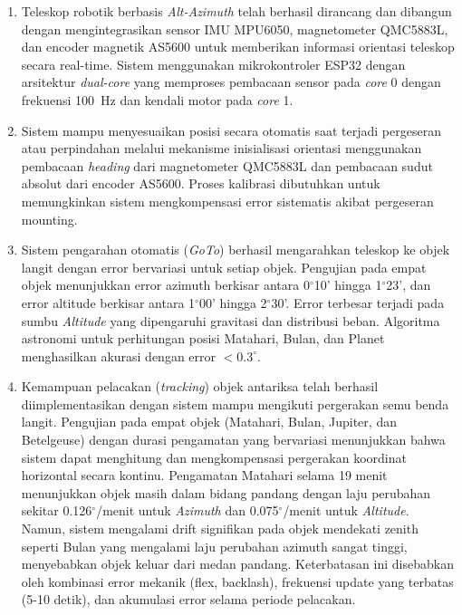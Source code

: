\begin{enumerate}
    \item Teleskop robotik berbasis \textit{Alt-Azimuth} telah berhasil dirancang dan dibangun dengan mengintegrasikan sensor IMU MPU6050, magnetometer QMC5883L, dan encoder magnetik AS5600 untuk memberikan informasi orientasi teleskop secara real-time. Sistem menggunakan mikrokontroler ESP32 dengan arsitektur \textit{dual-core} yang memproses pembacaan sensor pada \textit{core} 0 dengan frekuensi 100~Hz dan kendali motor pada \textit{core} 1.
    
    \item Sistem mampu menyesuaikan posisi secara otomatis saat terjadi pergeseran atau perpindahan melalui mekanisme inisialisasi orientasi menggunakan pembacaan \textit{heading} dari magnetometer QMC5883L dan pembacaan sudut absolut dari encoder AS5600. Proses kalibrasi dibutuhkan untuk memungkinkan sistem mengkompensasi error sistematis akibat pergeseran mounting.
    
    \item Sistem pengarahan otomatis (\textit{GoTo}) berhasil mengarahkan teleskop ke objek langit dengan error bervariasi untuk setiap objek. Pengujian pada empat objek menunjukkan error azimuth berkisar antara 0$^\circ$10' hingga 1$^\circ$23', dan error altitude berkisar antara 1$^\circ$00' hingga 2$^\circ$30'. Error terbesar terjadi pada sumbu \textit{Altitude} yang dipengaruhi gravitasi dan distribusi beban. Algoritma astronomi untuk perhitungan posisi Matahari, Bulan, dan Planet menghasilkan akurasi dengan error $< 0.3^{\circ}$.
    
    \item Kemampuan pelacakan (\textit{tracking}) objek antariksa telah berhasil diimplementasikan dengan sistem mampu mengikuti pergerakan semu benda langit. Pengujian pada empat objek (Matahari, Bulan, Jupiter, dan Betelgeuse) dengan durasi pengamatan yang bervariasi menunjukkan bahwa sistem dapat menghitung dan mengkompensasi pergerakan koordinat horizontal secara kontinu. Pengamatan Matahari selama 19 menit menunjukkan objek masih dalam bidang pandang dengan laju perubahan sekitar 0.126$^{\circ}$/menit untuk \textit{Azimuth} dan 0.075$^{\circ}$/menit untuk \textit{Altitude}. Namun, sistem mengalami drift signifikan pada objek mendekati zenith seperti Bulan yang mengalami laju perubahan azimuth sangat tinggi, menyebabkan objek keluar dari medan pandang. Keterbatasan ini disebabkan oleh kombinasi error mekanik (flex, backlash), frekuensi update yang terbatas (5-10 detik), dan akumulasi error selama periode pelacakan.
\end{enumerate}

